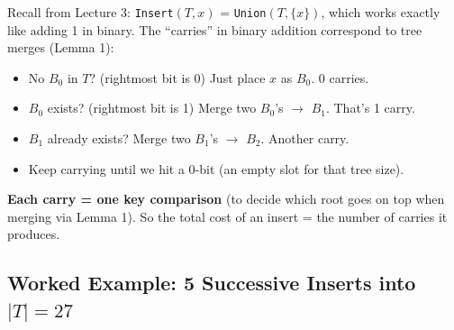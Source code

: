 \documentclass[11pt]{article}
\begin{document}
Recall from Lecture 3: \texttt{Insert$(T, x)$} = \texttt{Union$(T, \{x\})$}, which works exactly like \textcolor{rustW}{adding 1 in binary}. The ``carries'' in binary addition correspond to tree merges (Lemma 1):

\begin{itemize}[leftmargin=1.4em,itemsep=2pt]
    \item No $B_0$ in $T$? (rightmost bit is 0) Just place $x$ as $B_0$. \textcolor{greenO}{0 carries.}
    \item $B_0$ exists? (rightmost bit is 1) Merge two $B_0$'s $\to$ $B_1$. That's \textcolor{rustW}{1 carry}.
    \item $B_1$ already exists? Merge two $B_1$'s $\to$ $B_2$. \textcolor{rustW}{Another carry.}
    \item Keep carrying until we hit a 0-bit (an empty slot for that tree size).
\end{itemize}

\begin{defbox}[Carries = Cost]
\textcolor{rustW}{\textbf{Each carry = one key comparison}} (to decide which root goes on top when merging via Lemma 1). So the total cost of an insert = the number of carries it produces.
\end{defbox}

\subsection{Worked Example: 5 Successive Inserts into $|T|=27$}
\end{document}
